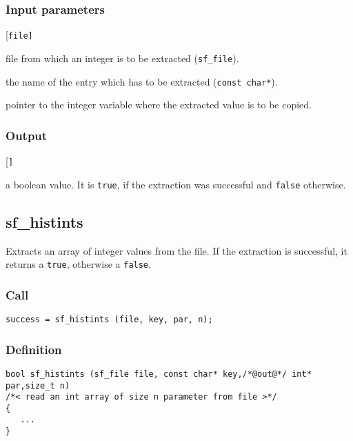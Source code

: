 \subsubsection*{Input parameters}
\begin{desclist}{\tt }{\quad}[\tt file]
   \setlength\itemsep{0pt}
   \item[file] file from which an integer is to be extracted (\texttt{sf\_file}).
   \item[key]  the name of the entry which has to be extracted (\texttt{const char*}).
   \item[par]  pointer to the integer variable where the extracted value is to be copied.
\end{desclist}

\subsubsection*{Output}
\begin{desclist}{\tt }{\quad}[\tt ]
   \setlength\itemsep{0pt}
   \item[success] a boolean value. It is \texttt{true}, if the extraction was successful and \texttt{false} otherwise.
\end{desclist}




\subsection{{sf\_histints}}
Extracts an array of integer values from the file. If the extraction is successful, it returns a \texttt{true}, otherwise a \texttt{false}.

\subsubsection*{Call}
\begin{verbatim}success = sf_histints (file, key, par, n);\end{verbatim}

\subsubsection*{Definition}
\begin{verbatim}
bool sf_histints (sf_file file, const char* key,/*@out@*/ int* par,size_t n) 
/*< read an int array of size n parameter from file >*/ 
{
   ...
}
\end{verbatim}

